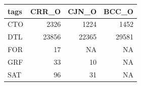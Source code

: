 
\begin{tabular}[t]{l|r|r|r}
\hline
tags & CRR\_O & CJN\_O & BCC\_O\\
\hline
CTO & 2326 & 1224 & 1452\\
\hline
DTL & 23856 & 22365 & 29581\\
\hline
FOR & 17 & NA & NA\\
\hline
GRF & 33 & 10 & NA\\
\hline
SAT & 96 & 31 & NA\\
\hline
\end{tabular}
